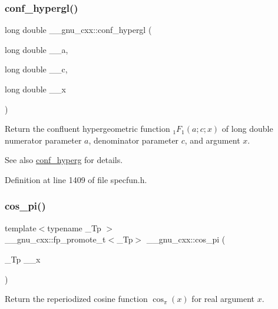 \subsubsection{\texorpdfstring{conf\+\_\+hypergl()}{conf\_hypergl()}}
{\footnotesize\ttfamily long double \+\_\+\+\_\+gnu\+\_\+cxx\+::conf\+\_\+hypergl (\begin{DoxyParamCaption}\item[{long double}]{\+\_\+\+\_\+a,  }\item[{long double}]{\+\_\+\+\_\+c,  }\item[{long double}]{\+\_\+\+\_\+x }\end{DoxyParamCaption})\hspace{0.3cm}{\ttfamily [inline]}}

Return the confluent hypergeometric function $ {}_1F_1(a;c;x) $ of {\ttfamily long double} numerator parameter $ a $, denominator parameter $ c $, and argument $ x $.

\begin{DoxySeeAlso}{See also}
\hyperlink{group__gnu__math__spec__func_ga4d01e85e7d295afca5d9f8b6c68f19cc}{conf\+\_\+hyperg} for details. 
\end{DoxySeeAlso}


Definition at line 1409 of file specfun.\+h.

\mbox{\label{group__gnu__math__spec__func_gafc4698ae591b0e9e61285b0794d43ef4}} 
\subsubsection{\texorpdfstring{cos\+\_\+pi()}{cos\_pi()}}
{\footnotesize\ttfamily template$<$typename \+\_\+\+Tp $>$ \\
\+\_\+\+\_\+gnu\+\_\+cxx\+::fp\+\_\+promote\+\_\+t$<$\+\_\+\+Tp$>$ \+\_\+\+\_\+gnu\+\_\+cxx\+::cos\+\_\+pi (\begin{DoxyParamCaption}\item[{\+\_\+\+Tp}]{\+\_\+\+\_\+x }\end{DoxyParamCaption})\hspace{0.3cm}{\ttfamily [inline]}}

Return the reperiodized cosine function $ \cos_\pi(x) $ for real argument $ x $.

